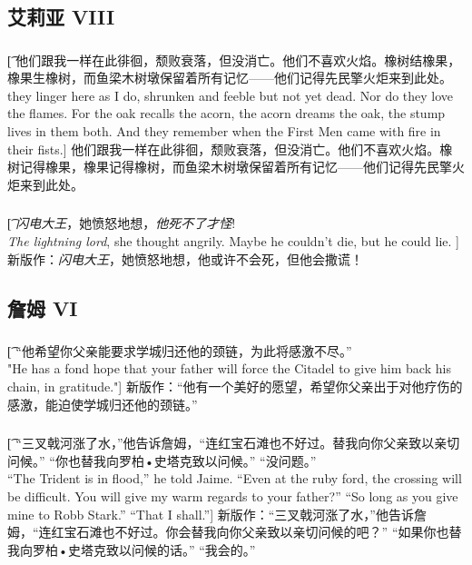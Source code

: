 \documentclass[12pt,a4paper]{article}
\begin{document}
\subsection{艾莉亚 VIII}
\subsubsection{}\t[
	他们跟我一样在此徘徊，颓败衰落，但没消亡。他们不喜欢火焰。橡树结橡果，橡果生橡树，而鱼梁木树墩保留着所有记忆——他们记得先民擎火炬来到此处。\\
	they linger here as I do, shrunken and feeble but not yet dead. Nor do they love the flames. For the oak recalls the acorn, the acorn dreams the oak, the stump lives in them both. And they remember when the First Men came with fire in their fists.]
	他们跟我一样在此徘徊，颓败衰落，但没消亡。他们不喜欢火焰。橡树记得橡果，橡果记得橡树，而鱼梁木树墩保留着所有记忆——他们记得先民擎火炬来到此处。
	
\subsubsection{}\t[
	\emph{闪电大王}，她愤怒地想，\emph{他死不了才怪}! \\
	\emph{The lightning lord}, she thought angrily. Maybe he couldn't die, but he could lie. ]
	新版作：\emph{闪电大王}，她愤怒地想，他或许不会死，但他会撒谎！
	
\subsection{詹姆 VI}
\subsubsection{}\t[
	“他希望你父亲能要求学城归还他的颈链，为此将感激不尽。”\\
	"He has a fond hope that your father will force the Citadel to give him back his chain, in gratitude."]
	新版作：“他有一个美好的愿望，希望你父亲出于对他疗伤的感激，能迫使学城归还他的颈链。”
	
\subsubsection{}\t[	
	“三叉戟河涨了水，”他告诉詹姆，“连红宝石滩也不好过。替我向你父亲致以亲切问候。”
	“你也替我向罗柏•史塔克致以问候。”
	“没问题。”\\
	“The Trident is in flood,” he told Jaime. “Even at the ruby ford, the crossing will be difficult. You will give my warm regards to your father?”
	“So long as you give mine to Robb Stark.”
	“That I shall.”]
	新版作：“三叉戟河涨了水，”他告诉詹姆，“连红宝石滩也不好过。你会替我向你父亲致以亲切问候的吧？”
	“如果你也替我向罗柏•史塔克致以问候的话。”
	“我会的。”
	
\end{document}
